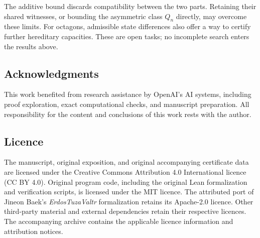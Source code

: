 The additive bound discards compatibility between the two parts. Retaining
their shared witnesses, or bounding the asymmetric class $Q_n$ directly,
may overcome these limits. For octagons, admissible state differences
also offer a way to certify further hereditary capacities. These are
open tasks; no incomplete search enters the results above.

\subsection*{Acknowledgments}
{\raggedright
This work benefited from research assistance by \mbox{OpenAI's} AI systems, including proof exploration, exact computational checks, and manuscript preparation. All responsibility for the content and conclusions of this work rests with the author.\par}

\subsection*{Licence}
The manuscript, original exposition, and original accompanying certificate
data are licensed under the Creative Commons Attribution 4.0 International
licence (CC BY 4.0). Original program code, including the original Lean
formalization and verification scripts, is licensed under the MIT licence.
The attributed port of Jineon Baek's \emph{ErdosTuzaValtr} formalization
retains its Apache-2.0 licence. Other third-party material and external
dependencies retain their respective licences. The accompanying archive
contains the applicable licence information and attribution notices.
